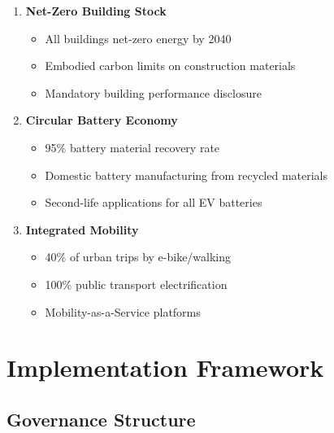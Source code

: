 \documentclass[12pt,a4paper]{article}
\begin{document}
\begin{enumerate}
    \item \textbf{Net-Zero Building Stock}
    \begin{itemize}
        \item All buildings net-zero energy by 2040
        \item Embodied carbon limits on construction materials
        \item Mandatory building performance disclosure
    \end{itemize}
    
    \item \textbf{Circular Battery Economy}
    \begin{itemize}
        \item 95\% battery material recovery rate
        \item Domestic battery manufacturing from recycled materials
        \item Second-life applications for all EV batteries
    \end{itemize}
    
    \item \textbf{Integrated Mobility}
    \begin{itemize}
        \item 40\% of urban trips by e-bike/walking
        \item 100\% public transport electrification
        \item Mobility-as-a-Service platforms
    \end{itemize}
\end{enumerate}

\section{Implementation Framework}

\subsection{Governance Structure}
\end{document}
